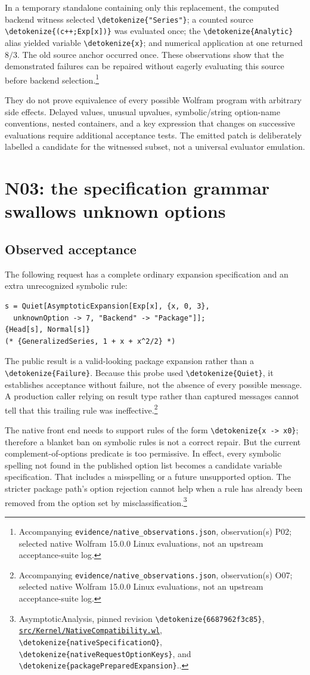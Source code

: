 \documentclass[11pt]{article}
\newcommand{\code}[1]{{\ttfamily\expandafter\nolinkurl\expandafter{\detokenize{#1}}}}
\newcommand{\repo}{https://github.com/VladimirReshetnikov/Asymptotic/blob/6687962f3c858a4f93623cfc496f33e35c6763d4/}
\newcommand{\src}[2]{\footnote{AsymptoticAnalysis, pinned revision \code{6687962f3c85}, \href{\repo#1}{\nolinkurl{#1}}, #2.}}
\newcommand{\obs}[1]{\footnote{Accompanying \nolinkurl{evidence/native_observations.json}, observation(s) #1; selected native Wolfram 15.0.0 Linux evaluations, not an upstream acceptance-suite log.}}
\begin{document}
In a temporary standalone containing only this replacement, the computed backend witness selected \code{"Series"}; a counted source \code{(c++;Exp[x])} was evaluated once; the \code{Analytic} alias yielded variable \code{x}; and numerical application at one returned $8/3$. The old source anchor occurred once. These observations show that the demonstrated failures can be repaired without eagerly evaluating this source before backend selection.\obs{P02}

They do not prove equivalence of every possible Wolfram program with arbitrary side effects. Delayed values, unusual upvalues, symbolic/string option-name conventions, nested containers, and a key expression that changes on successive evaluations require additional acceptance tests. The emitted patch is deliberately labelled a candidate for the witnessed subset, not a universal evaluator emulation.

\section{N03: the specification grammar swallows unknown options}

\subsection{Observed acceptance}
The following request has a complete ordinary expansion specification and an extra unrecognized symbolic rule:
\begin{lstlisting}
s = Quiet[AsymptoticExpansion[Exp[x], {x, 0, 3},
  unknownOption -> 7, "Backend" -> "Package"]];
{Head[s], Normal[s]}
(* {GeneralizedSeries, 1 + x + x^2/2} *)
\end{lstlisting}
The public result is a valid-looking package expansion rather than a \code{Failure}. Because this probe used \code{Quiet}, it establishes acceptance without failure, not the absence of every possible message. A production caller relying on result type rather than captured messages cannot tell that this trailing rule was ineffective.\obs{O07}

The native front end needs to support rules of the form \code{x -> x0}; therefore a blanket ban on symbolic rules is not a correct repair. But the current complement-of-options predicate is too permissive. In effect, every symbolic spelling not found in the published option list becomes a candidate variable specification. That includes a misspelling or a future unsupported option. The stricter package path's option rejection cannot help when a rule has already been removed from the option set by misclassification.\src{src/Kernel/NativeCompatibility.wl}{\code{nativeSpecificationQ}, \code{nativeRequestOptionKeys}, and \code{packagePreparedExpansion}.}
\end{document}
